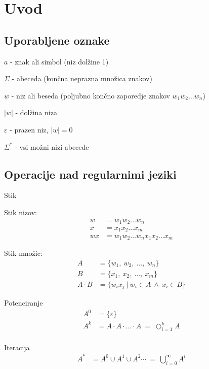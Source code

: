 \documentclass[10pt,a4paper,oneside]{book}
\begin{document}
\section{Uvod}
\subsection{Uporabljene oznake}
\begin{items}
\item $a$ - znak ali simbol (niz dolžine 1)
\item $\Sigma$ - abeceda (končna neprazna množica znakov)
\item $w$ - niz ali beseda (poljubno končno zaporedje znakov $w_1w_2 \ldots w_n$)
\item $|w|$ - dolžina niza
\item $\varepsilon$ - prazen niz, $|w|=0$
\item $\Sigma^*$ - vsi možni nizi abecede
\end{items}

\subsection{Operacije nad regularnimi jeziki}
\begin{items}
\item Stik
	\begin{items}
	\item Stik nizov:
		\begin{align*}
		w  &= w_1 w_2 \dots w_n\\
		x  &= x_1 x_2 \dots x_m\\
		wx &= w_1 w_2 \dots w_n x_1 x_2 \dots x_m
		\end{align*}
	\item Stik množic:
		\begin{align*} 
		A & = \{ w_1 ,\ w_2 ,\ \dots ,\ w_n \} \\ 
		B & = \{ x_1 ,\ x_2 ,\ \dots ,\ x_m \} \\ 
		A \cdot B & = \{ w_ix_j \ | \ w_i \in A \ \wedge \ x_i \in B \}
		\end{align*} 
	\end{items}
\item Potenciranje
	\begin{align*} 
	A^0 & = \{ \varepsilon \} \\
	A^k & = A \cdot A \cdot \ldots \cdot A \ = \ \bigcirc_{i=1}^{k} A \\
	\end{align*}
\item Iteracija
	\begin{align*} 
	A^* &= A^0 \cup A^1 \cup A^2 \cdots  \ = \ \bigcup_{i=0}^{ \infty } A^i
	\end{align*} 		
\end{items}
\end{document}
